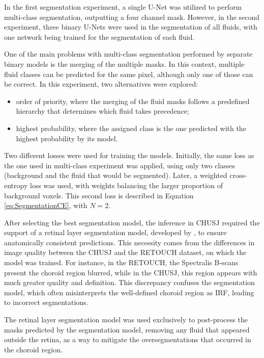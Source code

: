 In the first segmentation experiment, a single U-Net was utilized to perform multi-class segmentation, outputting a four channel mask. However, in the second experiment, three binary U-Nets were used in the segmentation of all fluids, with one network being trained for the segmentation of each fluid.
\par
One of the main problems with multi-class segmentation performed by separate binary models is the merging of the multiple masks. In this context, multiple fluid classes can be predicted for the same pixel, although only one of those can be correct. In this experiment, two alternatives were explored: 

\begin{itemize}
	\item order of priority, where the merging of the fluid masks follows a predefined hierarchy that determines which fluid takes precedence;
	\item highest probability, where the assigned class is the one predicted with the highest probability by its model.
\end{itemize} 

Two different losses were used for training the models. Initially, the same loss as the one used in multi-class experiment was applied, using only two classes (background and the fluid that would be segmented). Later, a weighted cross-entropy loss was used, with weights balancing the larger proportion of background voxels. This second loss is described in Equation \ref{eq:SegmentationCE}, with $N=2$.
\par
After selecting the best segmentation model, the inference in CHUSJ required the support of a retinal layer segmentation model, developed by \textcite{Melo2023}, to ensure anatomically consistent predictions. This necessity comes from the differences in image quality between the CHUSJ and the RETOUCH dataset, on which the model was trained. For instance, in the RETOUCH, the Spectralis B-scans present the choroid region blurred, while in the CHUSJ, this region appears with much greater quality and definition. This discrepancy confuses the segmentation model, which often misinterprets the well-defined choroid region as IRF, leading to incorrect segmentations.
\par
The retinal layer segmentation model was used exclusively to post-process the masks predicted by the segmentation model, removing any fluid that appeared outside the retina, as a way to mitigate the oversegmentations that occurred in the choroid region.

